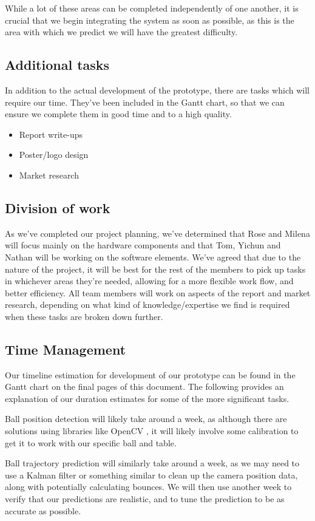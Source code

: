 \documentclass{article}
\begin{document}
While a lot of these areas can be completed independently of one another, it is crucial that we begin integrating the system as soon as possible, as this is the area with which we predict we will have the greatest difficulty. 
\subsection{Additional tasks}
In addition to the actual development of the prototype, there are tasks which will require our time. They've been included in the Gantt chart, so that we can ensure we complete them in good time and to a high quality. 
\begin{itemize}
    \item Report write-ups 
    \item Poster/logo design
    \item Market research
\end{itemize}
\subsection{Division of work}
As we've completed our project planning, we've determined that Rose and Milena will focus mainly on the hardware components and that Tom, Yichun and Nathan will be working on the software elements. We've agreed that due to the nature of the project, it will be best for the rest of the members to pick up tasks in whichever areas they're needed, allowing for a more flexible work flow, and better efficiency. All team members will work on aspects of the report and market research, depending on what kind of knowledge/expertise we find is required when these tasks are broken down further. 

\subsection{Time Management}
Our timeline estimation for development of our prototype can be found in the Gantt chart on the final pages of this document. The following provides an explanation of our duration estimates for some of the more significant tasks. 

Ball position detection will likely take around a week, as although there are solutions using libraries like OpenCV \cite{opencv}, it will likely involve some calibration to get it to work with our specific ball and table.

Ball trajectory prediction will similarly take around a week, as we may need to use a Kalman filter or something similar to clean up the camera position data, along with potentially calculating bounces. We will then use another week to verify that our predictions are realistic, and to tune the prediction to be as accurate as possible.
\end{document}
